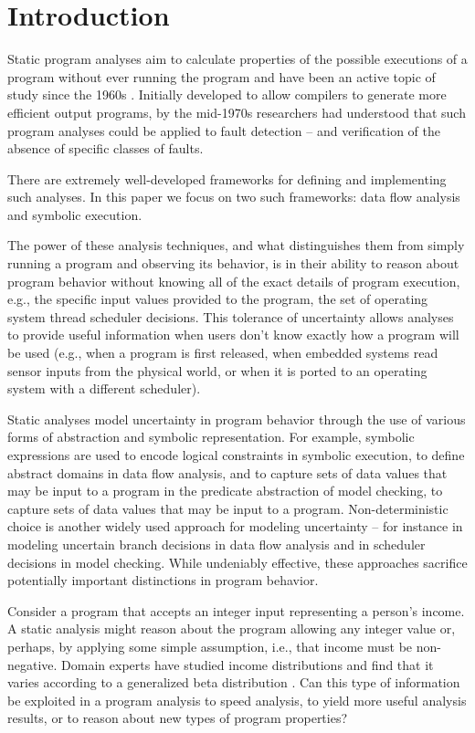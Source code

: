 \section{Introduction}
\label{sec:introduction}

Static program analyses aim to calculate properties of 
the possible executions of a program without ever running the program
and have been an active topic of study since the 1960s \cite{First}.
Initially developed to allow compilers to generate more efficient
output programs, by the mid-1970s \cite{fosdick1976data} researchers had
understood that such program analyses could be applied to fault
detection -- and verification of the absence of specific classes of faults.

There are extremely well-developed frameworks for defining
and implementing such analyses.  In this paper we focus on two
such frameworks: data flow analysis and symbolic execution.

The power of these analysis techniques, and what distinguishes them from
simply running a program and observing its behavior, is in their
ability to reason about program behavior without knowing all of the
exact details of program execution, e.g., the specific 
input values provided to the program, the set of operating system
thread scheduler decisions.  This tolerance of uncertainty allows analyses
to provide useful information when users don't know exactly how
a program will be used (e.g., when a program is first released, when
embedded systems read sensor inputs from the physical world, or
when it is ported to an operating system with a different scheduler).

Static analyses model uncertainty in program behavior
through the use of various forms of abstraction and symbolic representation.
For example, symbolic expressions are used to encode logical constraints 
in symbolic execution, to define abstract domains
in data flow analysis, and to capture sets of data values that may be input
to a program in the predicate abstraction of model checking, 
to capture sets of data values that may be input to a program.
Non-deterministic choice is another widely used approach for modeling
uncertainty -- for instance in modeling uncertain branch 
decisions in data flow analysis and
in scheduler decisions in model checking.
While undeniably effective, these approaches sacrifice potentially
important distinctions in program behavior.   

Consider a program that accepts an integer input representing
a person's income.  A static analysis might reason about the program
allowing any integer value or, perhaps, by applying
some simple assumption, i.e., that income must be non-negative.
Domain experts have studied income distributions and find that
it varies according to a generalized beta distribution 
\cite{mcdonald1984some,thurow1970analyzing}.  Can this type of information be 
exploited in a program analysis to speed analysis,
to yield more useful analysis results, or to reason 
about new types of program properties?

